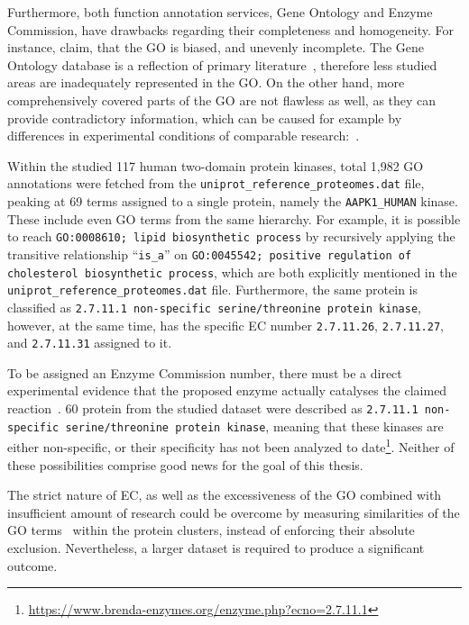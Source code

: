 Furthermore, both function annotation services, Gene Ontology and Enzyme Commission, have
drawbacks regarding their completeness and homogeneity.
For instance, \citet{gaudet2017gene} claim, that the GO is biased, and unevenly
incomplete.
The Gene Ontology database is a reflection of primary literature~\cite{gene2004gene},
therefore less studied areas are inadequately represented in the GO.
On the other hand, more comprehensively covered parts of the GO are not flawless as well,
as they can provide contradictory information, which can be caused for example by
differences in experimental conditions of comparable
research:~\cite{hass2004response, mason2005multiple}.

Within the studied 117 human two-domain protein kinases, total 1,982 GO annotations were
fetched from the \texttt{uniprot\_reference\_proteomes.dat} file, peaking at 69 terms
assigned to a single protein, namely the \texttt{AAPK1\_HUMAN} kinase.
These include even GO terms from the same hierarchy.
For example, it is possible to reach \texttt{GO:0008610; lipid biosynthetic process} by
recursively applying the transitive relationship ``\texttt{is\_a}'' on
\texttt{GO:0045542; positive regulation of cholesterol biosynthetic process}, which are
both explicitly mentioned in the \texttt{uniprot\_reference\_proteomes.dat} file.
Furthermore, the same protein is classified as \texttt{2.7.11.1 non-specific
serine/threonine protein kinase}, however, at the same time, has the specific EC number
\texttt{2.7.11.26}, \texttt{2.7.11.27}, and \texttt{2.7.11.31} assigned to it.

To be assigned an Enzyme Commission number, there must be a direct experimental evidence
that the proposed enzyme actually catalyses the claimed reaction~\cite{mcdonald2014fifty}.
60 protein from the studied dataset were described as \texttt{2.7.11.1 non-specific
serine/threonine protein kinase}, meaning that these kinases are either non-specific,
or their specificity has not been analyzed to
date\footnote{\url{https://www.brenda-enzymes.org/enzyme.php?ecno=2.7.11.1}}.
Neither of these possibilities comprise good news for the goal of this thesis.

The strict nature of EC, as well as the excessiveness of the GO combined with insufficient
amount of research could be overcome by measuring similarities of the GO
terms~\cite{li2010effectively, zhao2018gogo} within the protein clusters, instead of
enforcing their absolute exclusion.
Nevertheless, a larger dataset is required to produce a significant outcome.

